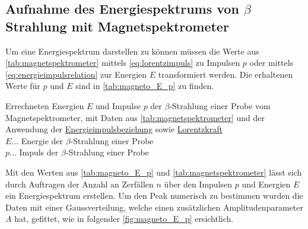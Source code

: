 \documentclass[12pt,english,ngerman]{scrartcl}
\begin{document}
\subsection{Aufnahme des Energiespektrums von \texorpdfstring{$\beta$}{beta}
	Strahlung mit Magnetspektrometer}

Um eine Energiespektrum darstellen zu können müssen die Werte aus
\autoref{tab:magnetspektrometer} mittels \autoref{eq:lorentzimpuls} zu Impulsen
$p$ oder mittels \autoref{eq:energieimpulsrelation} zur Energien $E$
transformiert werden. Die erhaltenen Werte für $p$ und $E$ sind in
\autoref{tab:magneto_E_p} zu finden.

\begin{table}[H]
	\caption[Energie- und Impulswerte der $\beta$-Strahlung einer  Probe]{
		Errechneten Energien $E$ und Impulse $p$ der $\beta$-Strahlung einer
		 Probe vom Magnetspektrometer, mit Daten aus
		\autoref{tab:magnetspektrometer} und der Anwendung der
		\hyperref[eq:energieimpulsrelation]{Energieimpulsbeziehung} sowie
		\hyperref[eq:lorentzimpuls]{Lorentzkraft} \\
		$E \dots$ Energie der $\beta$-Strahlung einer  Probe\\
		$p \dots$ Impuls der $\beta$-Strahlung einer  Probe\\
	}\label{tab:magneto_E_p}
	\centering
	
\end{table}

Mit den Werten aus \autoref{tab:magneto_E_p} und
\autoref{tab:magnetspektrometer} lässt sich durch Auftragen der Anzahl an
Zerfällen $n$ über den Impulsen $p$ und Energien $E$ ein Energiespektrum
erstellen. Um den Peak numerisch zu bestimmen wurden die Daten mit einer
Gaussverteilung, welche einen zusätzlichen Amplitudenparameter $A$ hat,
gefittet, wie in folgender \autoref{fig:magneto_E_p} ersichtlich.
\end{document}
